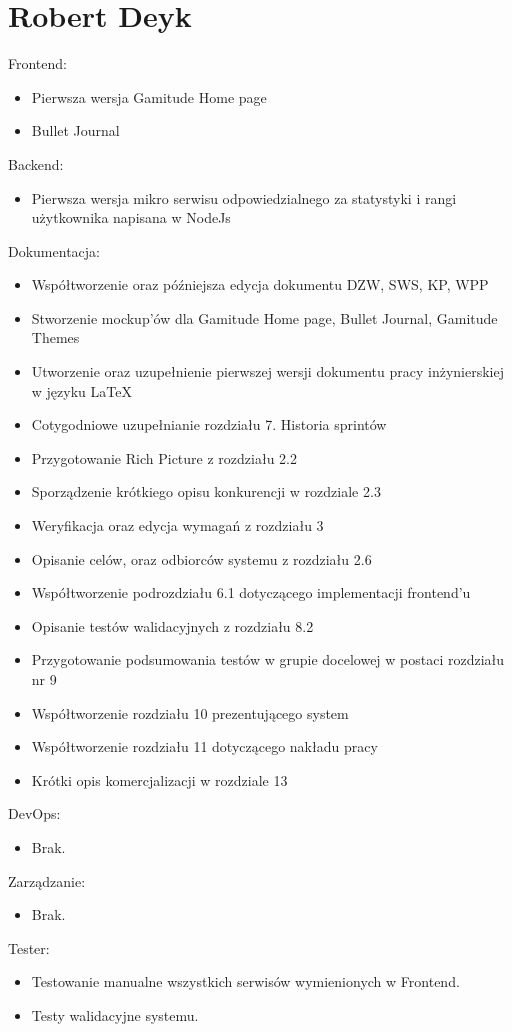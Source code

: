 \documentclass[a4paper,11pt]{report}
\begin{document}
\section {Robert Deyk}
Frontend:
\begin{itemize}
	\item Pierwsza wersja Gamitude Home page
	\item Bullet Journal
\end{itemize}
Backend:
\begin{itemize}
	\item Pierwsza wersja mikro serwisu odpowiedzialnego za statystyki i rangi użytkownika napisana w NodeJs
\end{itemize}
Dokumentacja:
\begin{itemize}
	\item Współtworzenie oraz późniejsza edycja dokumentu DZW, SWS, KP, WPP
	\item Stworzenie mockup'ów dla Gamitude Home page, Bullet Journal, Gamitude Themes
	\item Utworzenie oraz uzupełnienie pierwszej wersji dokumentu pracy inżynierskiej w języku LaTeX
	\item Cotygodniowe uzupełnianie rozdziału 7. Historia sprintów
	\item Przygotowanie Rich Picture z rozdziału 2.2
	\item Sporządzenie krótkiego opisu konkurencji w rozdziale 2.3
	\item Weryfikacja oraz edycja wymagań z rozdziału 3
	\item Opisanie celów, oraz odbiorców systemu z rozdziału 2.6
	\item Współtworzenie podrozdziału 6.1 dotyczącego implementacji frontend'u
	\item Opisanie testów walidacyjnych z rozdziału 8.2
	\item Przygotowanie podsumowania testów w grupie docelowej w postaci rozdziału nr 9
	\item Współtworzenie rozdziału 10 prezentującego system
	\item Współtworzenie rozdziału 11 dotyczącego nakładu pracy
	\item Krótki opis komercjalizacji w rozdziale 13 
\end{itemize}
DevOps:
\begin{itemize}
	\item Brak.
\end{itemize}
Zarządzanie:
\begin{itemize}
	\item Brak.
\end{itemize}
Tester:
\begin{itemize}
	\item Testowanie manualne wszystkich serwisów wymienionych w Frontend.
	\item Testy walidacyjne systemu.
\end{itemize}
\end{document}
